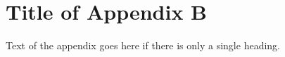 \section{Title of Appendix B}

\noindent Text of the appendix goes here if there is only a single heading. 